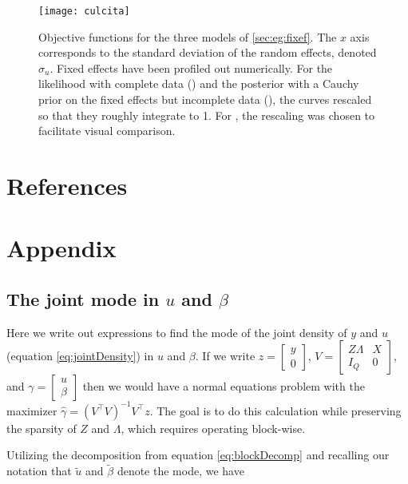 \documentclass[article,shortnames]{jss}
\begin{document}
\begin{figure}[t]
  \centering \texttt{[image: culcita]}
  \caption{Objective functions for the three models of
    \ref{sec:eg:fixef}. The $x$ axis corresponds to the standard deviation of
    the random effects, denoted $\sigma_u$. Fixed effects have been
    profiled out numerically. For the likelihood with complete data
    () and the posterior with a Cauchy prior on the fixed
    effects but incomplete
    data (), the curves rescaled so that they roughly integrate to
  1. For , the rescaling was chosen to facilitate visual comparison.}
  \label{fig:culcita}
\end{figure}

\section{References}


\section{Appendix}
\label{sec:appendix}

\subsection[The joint mode in u and beta]{The joint mode in $u$ and $\beta$}
\label{sec:appendix:jointMode}

Here we write out expressions to find the mode of the joint density of
$y$ and $u$ (equation \ref{eq:jointDensity}) in $u$ and $\beta$. If we
write $z = \begin{bmatrix}y \\ 0 \end{bmatrix}$,
$V = \begin{bmatrix} Z\Lambda & X \\ I_Q & 0 \end{bmatrix}$,
and $\gamma = \begin{bmatrix} u \\ \beta \end{bmatrix}$ then we
would have a normal equations problem with the maximizer $\hat{\gamma} =
(V^\top V)^{-1} V^\top z$. The goal is
to do this calculation while preserving the sparsity of $Z$ and
$\Lambda$, which requires operating block-wise.

Utilizing the decomposition from equation \ref{eq:blockDecomp} and
recalling our notation that $\tilde{u}$ and $\tilde{\beta}$ denote the
mode, we have
\end{document}
